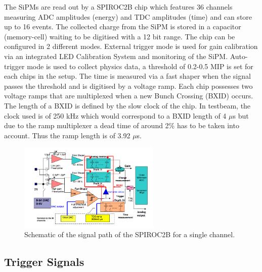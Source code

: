 \documentclass[twoside,a4paper,11pt]{article}
\begin{document}
The SiPMs are read out by a SPIROC2B chip which features 36 channels measuring ADC amplitudes (energy) and TDC amplitudes (time) and can store up to 16 events. The collected charge from the SiPM is stored in a capacitor (memory-cell) waiting to be digitised with a 12 bit range. The chip can be configured in 2 different modes. External trigger mode is used for gain calibration via an integrated LED Calibration System and monitoring of the SiPM. Auto-trigger mode is used to collect physics data, a threshold of 0.2-0.5 MIP is set for each chips in the setup.
The time is measured via a fast shaper when the signal passes the threshold and is digitised by a voltage ramp. Each chip possesses two voltage ramps that are multiplexed when a new Bunch Crossing (BXID) occurs. The length of a BXID is defined by the slow clock of the chip. In testbeam, the clock used is of 250 kHz which would correspond to a BXID length of 4 $\mu$s but due to the ramp multiplexer a dead time of around 2\% has to be taken into account. Thus the ramp length is of 3.92 $\mu$s.\\
\begin{figure}[htbp]
\begin{center}
\includegraphics[width=0.6\textwidth]{fig/Spiroc_layout.png}
\caption{Schematic of the signal path of the SPIROC2B for a single channel.}
\label{fig:SPIROC2B}
\end{center}
\end{figure}
\subsection{Trigger Signals}
\label{subsec:trigger}
\end{document}
